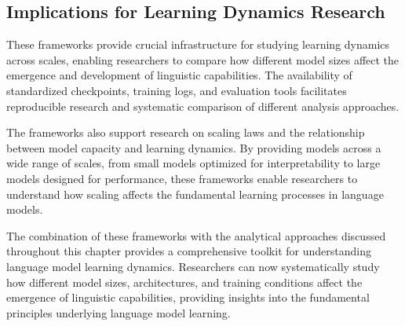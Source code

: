 \subsection{Implications for Learning Dynamics Research}

These frameworks provide crucial infrastructure for studying learning dynamics across scales, enabling researchers to compare how different model sizes affect the emergence and development of linguistic capabilities. The availability of standardized checkpoints, training logs, and evaluation tools facilitates reproducible research and systematic comparison of different analysis approaches.

The frameworks also support research on scaling laws and the relationship between model capacity and learning dynamics. By providing models across a wide range of scales, from small models optimized for interpretability to large models designed for performance, these frameworks enable researchers to understand how scaling affects the fundamental learning processes in language models.

The combination of these frameworks with the analytical approaches discussed throughout this chapter provides a comprehensive toolkit for understanding language model learning dynamics. Researchers can now systematically study how different model sizes, architectures, and training conditions affect the emergence of linguistic capabilities, providing insights into the fundamental principles underlying language model learning.
